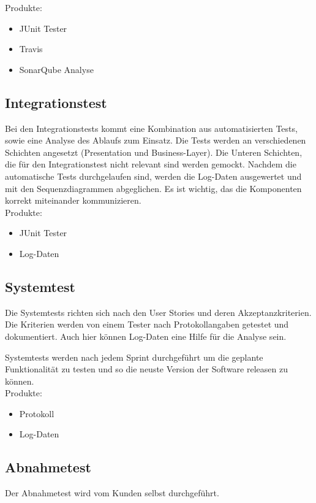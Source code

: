 Produkte:
\begin{itemize}
\item JUnit Tester
\item Travis
\item SonarQube Analyse
\end{itemize}

\subsection{Integrationstest}
Bei den Integrationstests kommt eine Kombination aus automatisierten Tests, 
sowie eine Analyse des Ablaufs zum Einsatz.
Die Tests werden an verschiedenen Schichten angesetzt (Presentation und Business-Layer). 
Die Unteren Schichten, die für den Integrationstest nicht relevant sind werden gemockt. 
Nachdem die automatische Tests durchgelaufen sind, werden die Log-Daten ausgewertet und mit den 
Sequenzdiagrammen abgeglichen. Es ist wichtig, das die Komponenten korrekt miteinander kommunizieren.\\

Produkte:
\begin{itemize}
\item JUnit Tester
\item Log-Daten
\end{itemize}

\subsection{Systemtest}
Die Systemtests richten sich nach den User Stories und deren Akzeptanzkriterien. 
Die Kriterien werden von einem Tester nach 
Protokollangaben getestet und dokumentiert. Auch hier können Log-Daten eine Hilfe für die Analyse sein.

Systemtests werden nach jedem Sprint durchgeführt um die geplante Funktionalität 
zu testen und so die neuste Version der Software releasen zu können.\\

Produkte:
\begin{itemize}
\item Protokoll
\item Log-Daten
\end{itemize}

\subsection{Abnahmetest}
Der Abnahmetest wird vom Kunden selbst durchgeführt.
